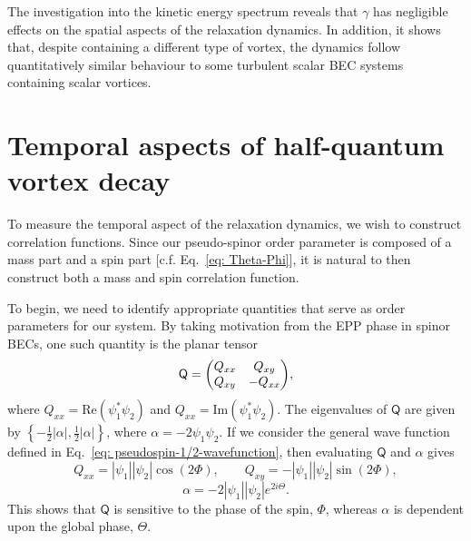 The investigation into the kinetic energy spectrum reveals that \(\gamma \) has
negligible effects on the spatial aspects of the relaxation dynamics.
In addition, it shows that, despite containing a different type of vortex, the
dynamics follow quantitatively similar behaviour to some turbulent scalar BEC
systems containing scalar vortices.

\section{Temporal aspects of half-quantum vortex decay}
To measure the temporal aspect of the relaxation dynamics, we wish to
construct correlation functions.
Since our pseudo-spinor order parameter is composed of a mass part and a spin
part [c.f. Eq.~\eqref{eq: Theta-Phi}], it is natural to then construct both a
mass and spin correlation function.

To begin, we need to identify appropriate quantities that serve as order
parameters for our system.
By taking motivation from the EPP phase in spinor BECs, one such quantity is
the planar tensor~\cite{Symes2017}
\begin{equation}
    \mathsf{Q} = \mqty(Q_{xx} & Q_{xy} \\ Q_{xy} & -Q_{xx}),
\end{equation}
where \(Q_{xx} = \mathrm{Re}(\psi_1^*\psi_2)\) and
\(Q_{xx} = \mathrm{Im}(\psi_1^*\psi_2)\).
The eigenvalues of \(\mathsf{Q}\) are given by
\( \left\{-\frac{1}{2}|\alpha|, \frac{1}{2}|\alpha|\right\} \), where
\(\alpha=-2\psi_1\psi_2\).
If we consider the general wave function defined in
Eq.~\eqref{eq: pseudospin-1/2-wavefunction}, then evaluating \(\mathsf{Q}\) and
\(\alpha \) gives
\begin{equation}
    Q_{xx} = |\psi_1||\psi_2|\cos({2\Phi}), \qquad
    Q_{xy} = -|\psi_1||\psi_2|\sin({2\Phi}),
\end{equation}
\begin{equation}
    \alpha = -2|\psi_1||\psi_2|e^{2i\Theta}.
\end{equation}
This shows that \(\mathsf{Q}\) is sensitive to the phase of the spin,
\( \Phi \), whereas \(\alpha \) is dependent upon the global phase,
\( \Theta \).

